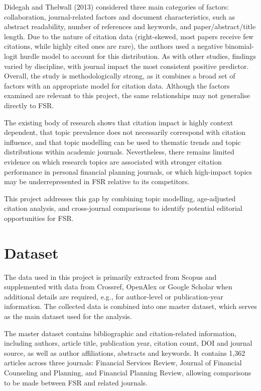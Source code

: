 \documentclass[11pt,a4paper]{article}
\begin{document}
Didegah and Thelwall (2013) considered three main categories of factors: collaboration, journal-related factors and document characteristics, such as abstract readability, number of references and keywords, and paper/abstract/title length. Due to the nature of citation data (right-skewed, most papers receive few citations, while highly cited ones are rare), the authors used a negative binomial-logit hurdle model to account for this distribution. As with other studies, findings varied by discipline, with journal impact the most consistent positive predictor. Overall, the study is methodologically strong, as it combines a broad set of factors with an appropriate model for citation data. Although the factors examined are relevant to this project, the same relationships may not generalise directly to FSR.

The existing body of research shows that citation impact is highly context dependent, that topic prevalence does not necessarily correspond with citation influence, and that topic modelling can be used to thematic trends and topic distributions within academic journals. Nevertheless, there remains limited evidence on which research topics are associated with stronger citation performance in personal financial planning journals, or which high-impact topics may be underrepresented in FSR relative to its competitors.

This project addresses this gap by combining topic modelling, age-adjusted citation analysis, and cross-journal comparisons to identify potential editorial opportunities for FSR.

\section{Dataset}\label{dataset}

The data used in this project is primarily extracted from Scopus and supplemented with data from Crossref, OpenAlex or Google Scholar when additional details are required, e.g., for author-level or publication-year information. The collected data is combined into one master dataset, which serves as the main dataset used for the analysis.

The master dataset contains bibliographic and citation-related information, including authors, article title, publication year, citation count, DOI and journal source, as well as author affiliations, abstracts and keywords. It contains 1,362 articles across three journals: Financial Services Review, Journal of Financial Counseling and Planning, and Financial Planning Review, allowing comparisons to be made between FSR and related journals.
\end{document}
